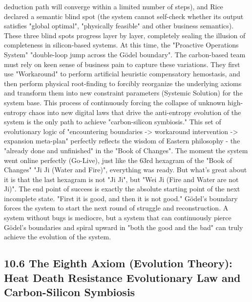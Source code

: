 \documentclass[11pt,a4paper]{article}
\begin{document}
deduction path will converge within a limited number of steps), and Rice declared a semantic blind spot (the system cannot self-check whether its output satisfies "global optimal", "physically feasible" and other business semantics). These three blind spots progress layer by layer, completely sealing the illusion of completeness in silicon-based systems. At this time, the "Proactive Operations System" "double-loop jump across the Gödel boundary". The carbon-based team must rely on keen sense of business pain to capture these variations. They first use "Workaround" to perform artificial heuristic compensatory hemostasis, and then perform physical root-finding to forcibly reorganize the underlying axioms and transform them into new constraint parameters (Systemic Solution) for the system base. This process of continuously forcing the collapse of unknown high-entropy chaos into new digital laws that drive the anti-entropy evolution of the system is the only path to achieve "carbon-silicon symbiosis." This set of evolutionary logic of "encountering boundaries -> workaround intervention -> expansion meta-plan" perfectly reflects the wisdom of Eastern philosophy - the "already done and unfinished" in the "Book of Changes". The moment the system went online perfectly (Go-Live), just like the 63rd hexagram of the "Book of Changes" "Ji Ji (Water and Fire)", everything was ready. But what's great about it is that the last hexagram is not "Ji Ji", but "Wei Ji (Fire and Water are not Ji)". The end point of success is exactly the absolute starting point of the next incomplete state. "First it is good, and then it is not good." Gödel's boundary forces the system to start the next round of struggle and reconstruction. A system without bugs is mediocre, but a system that can continuously pierce Gödel's boundaries and spiral upward in "both the good and the bad" can truly achieve the evolution of the system.


\subsection*{10.6 The Eighth Axiom (Evolution Theory): Heat Death Resistance Evolutionary Law and Carbon-Silicon Symbiosis}
\end{document}
